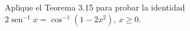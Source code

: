 \item Aplique el Teorema 3.15 para probar la identidad $2 \operatorname{sen}^{-1} x = \cos^{-1}(1 - 2x^2), \, x \ge 0$.

